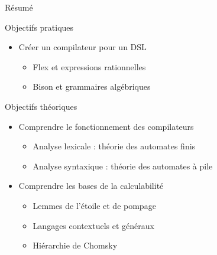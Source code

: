 
\begingroup

\begin{frame}{Résumé}
  \begin{block}{Objectifs pratiques}
    \begin{itemize}
    \item Créer un compilateur pour un DSL 
      \begin{itemize}
      \item Flex et expressions rationnelles
      \item Bison et grammaires algébriques
      \end{itemize}
    \end{itemize}
  \end{block}
 
  \begin{block}{Objectifs théoriques}
    \begin{itemize}
    \item Comprendre le fonctionnement des compilateurs
      \begin{itemize}
      \item Analyse lexicale : théorie des automates finis
      \item Analyse syntaxique : théorie des automates à pile 
      \end{itemize}
    \item Comprendre les bases de la calculabilité
      \begin{itemize}
      \item Lemmes de l'étoile et de pompage 
      \item Langages contextuels et généraux
      \item Hiérarchie de Chomsky
      \end{itemize}
    \end{itemize}
  \end{block}

\end{frame}

\endgroup
